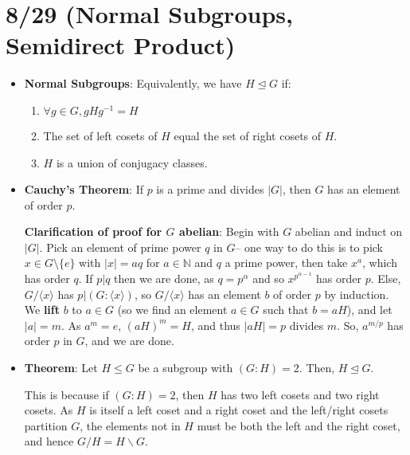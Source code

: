 \documentclass[11pt, oneside]{amsart}   	%
\theoremstyle{definition}
\begin{document}
\section{8/29 (Normal Subgroups, Semidirect Product)}

\begin{itemize}

	\item \textbf{Normal Subgroups}: Equivalently, we have $H\trianglelefteq G$ if:
		
		\begin{enumerate}
		
			\item $\forall g\in G, gHg^{-1} = H$
			
			\item The set of left cosets of $H$ equal the set of right cosets of $H$.
			
			\item $H$ is a union of conjugacy classes.
		
		\end{enumerate}

	\item \textbf{Cauchy's Theorem}: If $p$ is a prime and divides $|G|$, then $G$ has an element of order $p$.
	
	\textbf{Clarification of proof for $G$ abelian}: Begin with $G$ abelian and induct on $|G|$. Pick an element of prime power $q$ in $G$-- one 
	way to do this is to pick $x\in G\setminus \{e\}$ with $|x| = aq$ for $a\in\mathbb{N}$ and $q$ a prime power, then take $x^a$, which has 
	order $q$. If $p | q$ then we are done, as $q = p^\alpha$ and so $x^{p^{\alpha - 1}}$ has order $p$. Else, $G/\langle x \rangle$ has $p | 
	(G : \langle x \rangle)$, so $G / \langle x \rangle$ has an element $b$ of order $p$ by induction. We \textbf{lift} $b$ to $a\in G$ (so we find 
	an element $a\in G$ such that $b = aH$), and let $|a| = m$. As $a^m = e$, $(aH)^m = H$, and thus $|aH| = p$ divides $m$. So, $a^{m/p}$ 
	has order $p$ in $G$, and we are done.
	
	\item \textbf{Theorem}: Let $H\leq G$ be a subgroup with $(G : H) = 2$. Then, $H\trianglelefteq G$.
	
	This is because if $(G : H) = 2$, then $H$ has two left cosets and two right cosets. As $H$ is itself a left coset and a right coset and the 
	left/right cosets partition $G$, the elements not in $H$ must be both the left and the right coset, and hence $G/H = H\backslash G$.
	

\end{itemize}
\end{document}
